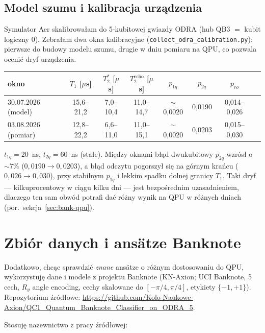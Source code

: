 \documentclass[11pt,a4paper]{article}
\begin{document}
\subsection{Model szumu i kalibracja urządzenia}

Symulator Aer skalibrowałam do 5-kubitowej gwiazdy ODRA (hub QB3 $=$ kubit logiczny 0).
Zebrałam dwa okna kalibracyjne (\texttt{collect\_odra\_calibration.py}): pierwsze do budowy
modelu szumu, drugie w dniu pomiaru na QPU, co pozwala ocenić dryf urządzenia.

\begin{center}
\begin{tabular}{@{}lccccccc@{}}
\toprule
okno & $T_1$ [$\mu$s] & $T_2^{*}$ [$\mu$s] & $T_2^{\text{echo}}$ [$\mu$s] & $p_{1q}$ & $p_{2q}$ & $p_{ro}$ \\
\midrule
30.07.2026 (model)   & 15,6--21,2 & 7,0--10,4 & 11,0--14,7 & $\sim$0,0020 & 0,0190 & 0,014--0,026 \\
03.08.2026 (pomiar)  & 12,8--22,2 & 6,6--11,0 & 11,0--15,1 & $\sim$0,0020 & 0,0203 & 0,015--0,030 \\
\bottomrule
\end{tabular}
\end{center}

\noindent
$t_{1q} = 20$~ns, $t_{2q} = 60$~ns (stałe). Między oknami błąd dwukubitowy $p_{2q}$ wzrósł
o $\sim7\%$ ($0{,}0190\to0{,}0203$), a błąd odczytu pogorszył się na górnym krańcu
($0{,}026\to0{,}030$), przy stabilnym $p_{1q}$ i lekkim spadku dolnej granicy $T_1$. Taki
dryf --- kilkuprocentowy w ciągu kilku dni --- jest bezpośrednim uzasadnieniem, dlaczego ten
sam obwód potrafi dać różny wynik na QPU w różnych dniach (por.\ sekcja~\ref{sec:bank-qpu}).

\FloatBarrier
\clearpage
\section{Zbiór danych i ansätze Banknote}

Dodatkowo, chcąc sprawdzić \emph{znane} ansätze o różnym dostosowaniu do QPU, wykorzystuję
dane i modele z projektu Banknote (KN-Axion; UCI Banknote, 5 cech, $R_y$ angle encoding,
cechy skalowane do $[-\pi/4, \pi/4]$, etykiety $\{-1,+1\}$). Repozytorium źródłowe:
\url{https://github.com/Kolo-Naukowe-Axion/QC1_Quantum_Banknote_Classifier_on_ODRA_5}.

Stosuję nazewnictwo z pracy źródłowej:
\end{document}
